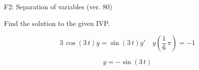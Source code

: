 \begin{exercise}
  \begin{exerciseTitle}F2: Separation of variables (ver. 80)\end{exerciseTitle}
  \begin{exerciseStatement}
    
Find the solution to the given IVP.

    
\[3 \, \cos\left(3 \, t\right) y= \sin\left(3 \, t\right) y'\hspace{1em} y\left( \frac{1}{6} \, \pi \right)= -1\]

  \end{exerciseStatement}
  \begin{exerciseAnswer}
    
\[y= -\sin\left(3 \, t\right)\]

  \end{exerciseAnswer}
\end{exercise}